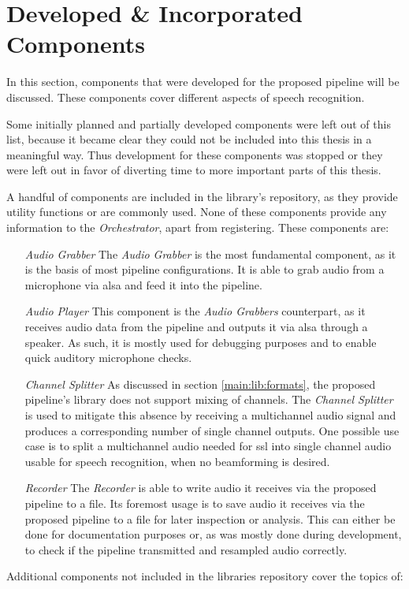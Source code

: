 
\section{Developed \& Incorporated Components}
\label{main:components:start}
In this section, components that were developed for the proposed pipeline will be discussed.
These components cover different aspects of speech recognition.

Some initially planned and partially developed components were left out of this list, because it became clear they could not be included into this thesis in a meaningful way.
Thus development for these components was stopped or they were left out in favor of diverting time to more important parts of this thesis.


A handful of components are included in the library's repository, as they provide utility functions or are commonly used.
None of these components provide any information to the \textit{Orchestrator}, apart from registering.
These components are:
\begin{itemize}[leftmargin=1in]
	\item[\textit{Audio Grabber}] The \textit{Audio Grabber} is the most fundamental component, as it is the basis of most pipeline configurations.
	It is able to grab audio from a microphone via \gls{alsa} and feed it into the pipeline.

	\item[\textit{Audio Player}] This component is the \textit{Audio Grabbers} counterpart, as it receives audio data from the pipeline and outputs it via \gls{alsa} through a speaker.
	As such, it is mostly used for debugging purposes and to enable quick auditory microphone checks.

	\item[\textit{Channel Splitter}] As discussed in section \ref{main:lib:formats}, the proposed pipeline's library does not support mixing of channels.
	The \textit{Channel Splitter} is used to mitigate this absence by receiving a multichannel audio signal and produces a corresponding number of single channel outputs.
	One possible use case is to split a multichannel audio needed for \gls{ssl} into single channel audio usable for speech recognition, when no beamforming is desired.

	\item[\textit{Recorder}] The \textit{Recorder} is able to write audio it receives via the proposed pipeline to a file.
	Its foremost usage is to save audio it receives via the proposed pipeline to a file for later inspection or analysis.
	This can either be done for documentation purposes or, as was mostly done during development, to check if the pipeline transmitted and resampled audio correctly.
\end{itemize}
Additional components not included in the libraries repository cover the topics of:

